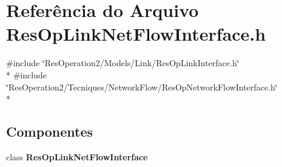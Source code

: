 \section{Referência do Arquivo Res\+Op\+Link\+Net\+Flow\+Interface.\+h}
\label{_res_op_link_net_flow_interface_8h}
{\ttfamily \#include \char`\"{}Res\+Operation2/\+Models/\+Link/\+Res\+Op\+Link\+Interface.\+h\char`\"{}}\\*
{\ttfamily \#include \char`\"{}Res\+Operation2/\+Tecniques/\+Network\+Flow/\+Res\+Op\+Network\+Flow\+Interface.\+h\char`\"{}}\\*
\subsection*{Componentes}
\begin{DoxyCompactItemize}
\item 
class {\bf Res\+Op\+Link\+Net\+Flow\+Interface}
\end{DoxyCompactItemize}
